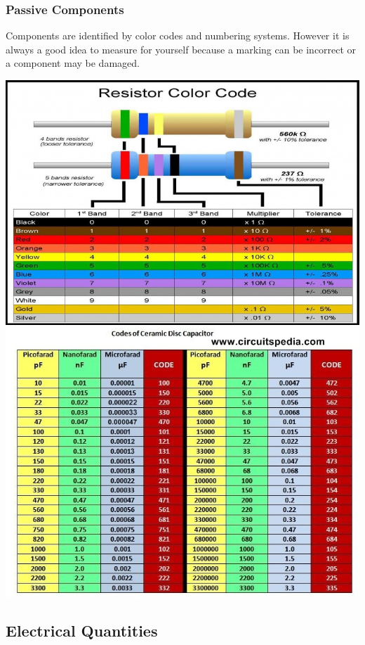 \documentclass[fleqn]{beamer} %
\newcommand{\sectionIsubsectionItitle}{Passive Components}
\newcommand{\sectionIsubsectionIItitle}{Electrical Quantities}
\begin{document}
			\begin{frame}
				\frametitle{\sectionIsubsectionItitle}

				Components are identified by color codes and numbering systems. However it is always a good idea to measure for yourself because a marking can be  incorrect  or a component may be damaged. \vspc

				\includegraphics[scale=.25]{images/resistor_color_codes.jpg}
				\includegraphics[scale=.3]{images/ceramic_capacitor_codes.jpg}

			\end{frame}

		\subsection{\sectionIsubsectionIItitle}\label{sectionIsubsectionII}
\end{document}
